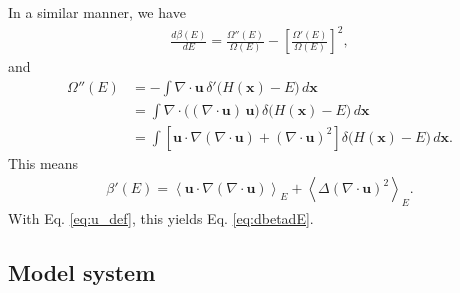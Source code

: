 \documentclass[reprint]{revtex4-1}
\begin{document}
In a similar manner, we have
%
\begin{align*}
  \frac
  {
    d \beta(E)
  }
  {
    d E
  }
  =
  \frac
  {
    \Omega''(E)
  }
  {
    \Omega(E)
  }
  -
  \left[
    \frac
    {
      \Omega'(E)
    }
    {
      \Omega(E)
    }
  \right]^2
  ,
\end{align*}
%
and
%
\begin{align*}
  \Omega''(E)
  &= -\int \nabla \cdot \mathbf u \,
     \delta'\bigl( H(\mathbf x) - E \bigr) \, d\mathbf x
  \\
  &= \int
     \nabla \cdot \bigl( (\nabla \cdot \mathbf u) \, \mathbf u \bigr) \,
     \delta\bigl( H(\mathbf x) - E \bigr) \, d\mathbf x
  \\
  &= \int
     \left[
     \mathbf u \cdot \nabla (\nabla \cdot \mathbf u)
     +
     (\nabla \cdot \mathbf u)^2
     \right]
     \delta\bigl( H(\mathbf x) - E \bigr) \, d\mathbf x
  .
\end{align*}
%
This means
%
\begin{align*}
  \beta'(E)
  =
  \left\langle
     \mathbf u \cdot \nabla (\nabla \cdot \mathbf u)
  \right\rangle_E
  +
  \left\langle
    \Delta (\nabla \cdot \mathbf u)^2
  \right\rangle_E
  .
\end{align*}
%
With Eq. \eqref{eq:u_def},
this yields Eq. \eqref{eq:dbetadE}.



\subsection{Model system}
\end{document}
